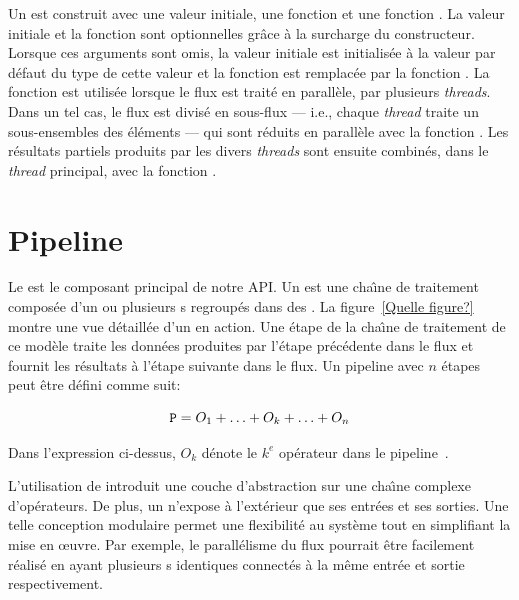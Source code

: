 Un  est construit avec une valeur initiale, une fonction  et une fonction . La valeur initiale et la fonction  sont optionnelles gr\^ace \`a la surcharge du constructeur. Lorsque ces arguments sont omis, la valeur initiale est initialis\'ee \`a la valeur par d\'efaut du type de cette valeur et la fonction  est remplac\'ee par la fonction . La fonction  est utilis\'ee lorsque le flux est trait\'e en parall\`ele, par plusieurs \emph{threads}. Dans un tel cas, le flux est divis\'e en sous-flux --- i.e., chaque \emph{thread} traite un sous-ensembles des éléments --- qui sont r\'eduits en parall\`ele avec la fonction . Les r\'esultats partiels produits par les divers \emph{threads} sont ensuite combin\'es, dans le \emph{thread} principal, avec la fonction . 




\section{Pipeline}

Le  est le composant principal de notre {API}. Un  est une cha\^{\i}ne de traitement compos\'ee d'un ou plusieurs s regroup\'es dans des . La figure~\ref{Quelle figure?} montre une vue d\'etaill\'ee d'un  en action. Une \'etape de la cha\^{\i}ne de traitement de ce mod\`ele traite les donn\'ees produites par l'\'etape pr\'ec\'edente dans le flux et fournit les r\'esultats \`a l'étape suivante dans le flux. Un pipeline  avec $n$ \'etapes peut \^etre d\'efini comme suit:


\[
	{\tt P} = O_1 +  \ldots + O_k + \ldots + O_n
\]


Dans l'expression ci-dessus, $O_k$ d\'enote le $k^e$ op\'erateur dans le pipeline~.

L'utilisation de  introduit une couche d'abstraction sur une cha\^{\i}ne complexe d'op\'erateurs. De plus, un  n'expose à l'ext\'erieur que ses entr\'ees et ses sorties. Une telle conception modulaire permet une flexibilit\'e au syst\`eme tout en simplifiant la mise en œuvre. Par exemple, le parall\'elisme du flux pourrait \^etre facilement r\'ealis\'e en ayant plusieurs s identiques connect\'es \`a la m\^eme entr\'ee et sortie respectivement.


